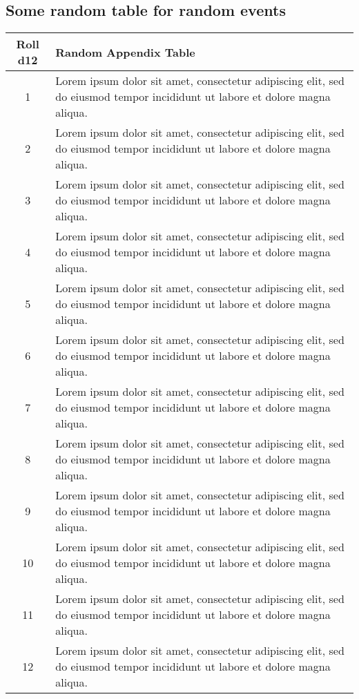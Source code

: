 \documentclass[a4paper,14pt,twoside]{extarticle}
\begin{document}
\subsection{\centering Some random table for random events}
\begin{table}[!htbp]
    \centering
    \begin{tabular}{|c|p{14.5cm}|}
        \hline
        \textbf{Roll d12} & \textbf{Random Appendix Table} \\
        \hline
        \hline
        1 &   Lorem ipsum dolor sit amet, consectetur adipiscing elit, sed do eiusmod tempor incididunt ut labore et dolore magna aliqua.\\
        2 &   Lorem ipsum dolor sit amet, consectetur adipiscing elit, sed do eiusmod tempor incididunt ut labore et dolore magna aliqua.\\
        3 &   Lorem ipsum dolor sit amet, consectetur adipiscing elit, sed do eiusmod tempor incididunt ut labore et dolore magna aliqua.\\
        4 &   Lorem ipsum dolor sit amet, consectetur adipiscing elit, sed do eiusmod tempor incididunt ut labore et dolore magna aliqua.\\
        5 &   Lorem ipsum dolor sit amet, consectetur adipiscing elit, sed do eiusmod tempor incididunt ut labore et dolore magna aliqua.\\
        6 &   Lorem ipsum dolor sit amet, consectetur adipiscing elit, sed do eiusmod tempor incididunt ut labore et dolore magna aliqua.\\
        7 &   Lorem ipsum dolor sit amet, consectetur adipiscing elit, sed do eiusmod tempor incididunt ut labore et dolore magna aliqua.\\
        8 &   Lorem ipsum dolor sit amet, consectetur adipiscing elit, sed do eiusmod tempor incididunt ut labore et dolore magna aliqua.\\
        9 &   Lorem ipsum dolor sit amet, consectetur adipiscing elit, sed do eiusmod tempor incididunt ut labore et dolore magna aliqua.\\
        10 &  Lorem ipsum dolor sit amet, consectetur adipiscing elit, sed do eiusmod tempor incididunt ut labore et dolore magna aliqua.\\
        11 &  Lorem ipsum dolor sit amet, consectetur adipiscing elit, sed do eiusmod tempor incididunt ut labore et dolore magna aliqua.\\
        12 &  Lorem ipsum dolor sit amet, consectetur adipiscing elit, sed do eiusmod tempor incididunt ut labore et dolore magna aliqua.\\
        \hline
    \end{tabular}
    \label{tab:monster-descriptions}
\end{table}
\end{document}
